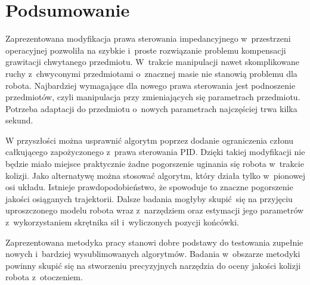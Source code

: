 
\chapter{Podsumowanie\label{chap:podsumowanie}}

Zaprezentowana modyfikacja prawa sterowania impedancyjnego w~przestrzeni operacyjnej pozwoliła na szybkie i~proste rozwiązanie problemu kompensacji grawitacji chwytanego przedmiotu. W~trakcie manipulacji nawet skomplikowane ruchy z~chwyconymi przedmiotami o~znacznej masie nie stanowią problemu dla robota. Najbardziej wymagające dla nowego prawa sterowania jest podnoszenie przedmiotów, czyli manipulacja przy zmieniających się parametrach przedmiotu. Potrzeba adaptacji do przedmiotu o~nowych parametrach najczęściej trwa kilka sekund. 


W przyszłości można usprawnić algorytm poprzez dodanie ograniczenia członu całkującego zapożyczonego z~prawa sterowania PID. Dzięki takiej modyfikacji nie będzie miało miejsce praktycznie żadne pogorszenie uginania się robota w~trakcie kolizji. Jako alternatywę można stosować algorytm, który działa tylko w~pionowej osi układu. Istnieje prawdopodobieństwo, że spowoduje to znaczne pogorszenie jakości osiąganych trajektorii.  Dalsze badania mogłyby skupić się na przyjęciu uproszczonego modelu robota wraz z~narzędziem oraz estymacji jego parametrów z~wykorzystaniem skrętnika sił i~wyliczonych pozycji końcówki.

Zaprezentowana metodyka pracy stanowi dobre podstawy do testowania zupełnie nowych i~bardziej wysublimowanych algorytmów.  Badania w~obszarze metodyki powinny skupić się na stworzeniu precyzyjnych narzędzia do oceny jakości kolizji robota z~otoczeniem.  